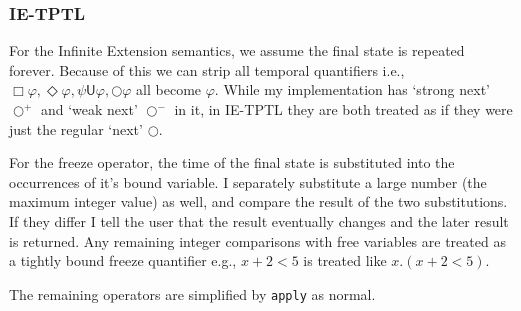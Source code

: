 \documentclass[a4paper]{article}
\newcommand{\U}{\mathsf{U}}
\newcommand{\sn}{\bigcirc^+}
\newcommand{\wn}{\bigcirc^-}
\begin{document}
\subsubsection{IE-TPTL}
For the Infinite Extension semantics, we assume the final state is repeated forever. Because of this we can strip all temporal quantifiers i.e., $\Box \varphi, \Diamond \varphi, \psi \U \varphi, \bigcirc \varphi$ all become $\varphi$. While my implementation has `strong next' $\sn$ and `weak next' $\wn$ in it, in IE-TPTL they are both treated as if they were just the regular `next' $\bigcirc$.

For the freeze operator, the time of the final state is substituted into the occurrences of it's bound variable. I separately substitute a large number (the maximum integer value) as well, and compare the result of the two substitutions. If they differ I tell the user that the result eventually changes and the later result is returned. Any remaining integer comparisons with free variables are treated as a tightly bound freeze quantifier e.g., $x + 2 < 5$ is treated like $x. (x + 2 < 5)$.

The remaining operators are simplified by \texttt{apply} as normal.

\end{document}
